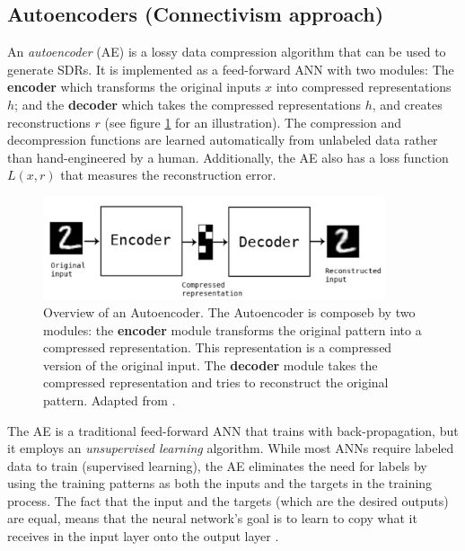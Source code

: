 \documentclass{article}
\begin{document}
\subsection{Autoencoders (Connectivism approach)}
\label{sec_AEs}


An \textit{autoencoder} (AE) is a lossy data compression algorithm that can be used to generate SDRs. It is implemented as a feed-forward ANN with two modules: The \textbf{encoder} which transforms the original inputs $x$ into compressed representations $h$; and the \textbf{decoder} which takes the compressed representations $h$, and creates reconstructions $r$ (see figure \ref{fig:autoencoder} for an illustration). The compression and decompression functions are learned automatically from unlabeled data rather than hand-engineered by a human. Additionally, the AE also has a loss function $L(x,r)$ that measures the reconstruction error.

\begin{figure}[h]
    \centering
    \includegraphics[width=0.9\textwidth]{img/autoencoder.PNG}
    \caption{Overview of an Autoencoder. The Autoencoder is composeb by two modules: the \textbf{encoder} module transforms the original pattern into a compressed representation. This representation is a compressed version of the original input. The \textbf{decoder} module takes the compressed representation and tries to reconstruct the original pattern. Adapted from \cite{chollet2016building}.}
\label{fig:autoencoder}
\end{figure}

The AE is a traditional feed-forward ANN that trains with back-propagation, but it employs an \textit{unsupervised learning} algorithm. While most ANNs require labeled data to train (supervised learning), the AE eliminates the need for labels by using the training patterns as both the inputs and the targets in the training process. The fact that the input and the targets (which are the desired outputs) are equal, means that the neural network's goal is to learn to copy what it receives in the input layer onto the output layer \cite{bengio2017deep}.
\end{document}
